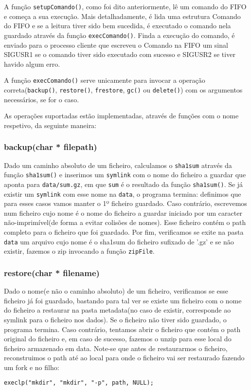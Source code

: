 A função \texttt{setupComando()}, como foi dito anteriormente, lê um comando do FIFO e começa a sua execução. Mais detalhadamente, é lida uma estrutura 
Comando do FIFO e se a leitura tiver sido bem sucedida, é executado o comando nela guardado através da função \texttt{execComando()}. Finda a execução do comando,
é enviado para o processo cliente que escreveu o Comando na FIFO um sinal SIGUSR1 se o comando tiver sido executado com sucesso e SIGUSR2 se tiver havido algum
erro.

A função \texttt{execComando()} serve unicamente para invocar a operação correta(\texttt{backup()}, \texttt{restore()}, \texttt{frestore}, \texttt{gc()} ou \texttt{delete()})
com os argumentos necessários, se for o caso.

As operações suportadas estão implementadas, através de funções com o nome respetivo, da seguinte maneira:

\subsubsection{backup(char * filepath)}
Dado um caminho absoluto de um ficheiro, calculamos o \texttt{sha1sum} através da função \texttt{sha1sum()} e inserimos um \texttt{symlink} com o nome do ficheiro a guardar que aponta
para \texttt{data/sum.gz}, em que \texttt{sum} é o resultado da função \texttt{sha1sum()}. Se já existir um \texttt{symlink} com esse nome na \texttt{data},
o programa termina: definimos que para esses casos vamos manter o 1º ficheiro guardado. Caso contrário, escrevemos num ficheiro cujo nome é o nome do ficheiro a 
guardar iniciado por um caracter não-imprimível(de forma a evitar colisões de nomes). Esse ficheiro contém o path completo para o ficheiro que foi guardado.
Por fim, verificamos se exite na pasta \texttt{data} um arquivo cujo nome é o sha1sum do ficheiro sufixado de '.gz' e se não existir, fazemos o zip invocando a função \texttt{zipFile}.

\subsubsection{restore(char * filename)}
Dado o nome(e não o caminho absoluto) de um ficheiro, verificamos se esse ficheiro já foi guardado, bastando para tal ver se existe um ficheiro com
o nome do ficheiro a restaurar na pasta metadata(no caso de existir, corresponde ao symlink para o ficheiro nos dados). Se o ficheiro não tiver sido guardado, o programa termina.
Caso contrário, tentamos abrir o ficheiro que contém o path original do ficheiro e, em caso de sucesso, fazemos o unzip para esse local do ficheiro 
armazenado em data. Note-se que antes de restaurarmos o ficheiro, reconstruimos o path até ao local para onde o ficheiro vai ser restaurado
fazendo um fork e no filho:
\begin{verbatim}
execlp("mkdir", "mkdir", "-p", path, NULL);
\end{verbatim}

